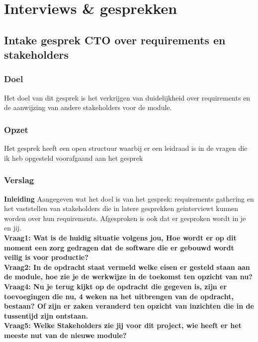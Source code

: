 
\chapter{Interviews \& gesprekken}

\section{Intake gesprek CTO over requirements en stakeholders}
\subsection{Doel}
Het doel van dit gesprek is het verkrijgen van duidelijkheid over requirements en de aanwijzing van andere stakeholders voor de module.
\subsection{Opzet}
Het gesprek heeft een open structuur waarbij er een leidraad is in de vragen die ik heb opgesteld voorafgaand aan het gesprek
\subsection{Verslag}
\textbf{Inleiding}
Aangegeven wat het doel is van het gesprek: requirements gathering en het vaststellen van stakeholders die in latere gesprekken geinterviewt kunnen worden over hun requirements. Afgesproken is ook dat er gesproken wordt in je en jij.\\
\textbf{Vraag1: Wat is de huidig situatie volgens jou, Hoe wordt er op dit moment een zorg gedragen dat de software die er gebouwd wordt veilig is voor productie?}
\lipsum[01]\\

\textbf{Vraag2: In de opdracht staat vermeld welke eisen er gesteld staan aan de module, hoe zie je de werkwijze in de toekomst ten opzicht van nu?}
\lipsum[03]\\

\textbf{Vraag4: Nu je terug kijkt op de opdracht die gegeven is, zijn er toevoegingen die nu, 4 weken na het uitbrengen van de opdracht, bestaan? Of zijn er zaken veranderd ten opzicht van inzichten die in de tussentijd zijn ontstaan.}
\lipsum[05]\\

\textbf{Vraag5: Welke Stakeholders zie jij voor dit project, wie heeft er het meeste nut van de nieuwe module? }
\lipsum[06]\\


